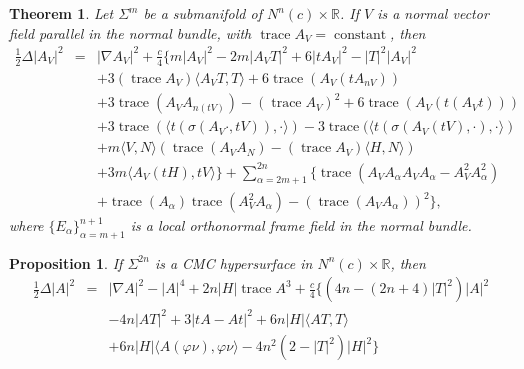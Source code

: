 \documentclass[10pt,a4paper]{amsart}
\newtheorem{theorem}{Theorem}
\newtheorem{proposition}{Proposition}
\DeclareMathOperator{\cst}{constant}
\DeclareMathOperator{\trace}{trace} \DeclareMathOperator{\di}{div}
\begin{document}
\begin{theorem}\label{thm:delta2_prod}
Let $\Sigma^m$ be a submanifold of $N^n(c)\times\mathbb{R}$. If $V$ is a normal vector field parallel in the normal bundle, with $\trace A_V=\cst$, then
\begin{eqnarray}\label{eq:delta2_prod}
\frac{1}{2}\Delta|A_V|^2&=&|\nabla A_V|^2+\frac{c}{4}\{m|A_V|^2-2m|A_VT|^2+6|tA_V|^2-|T|^2|A_V|^2\\\nonumber &&+3(\trace A_V)\langle A_VT,T\rangle+6\trace(A_V(tA_{nV}))\\\nonumber &&+3\trace(A_VA_{n(tV)})-(\trace A_V)^2+6\trace(A_V(t(A_Vt)))\\\nonumber &&+3\trace(\langle t(\sigma(A_V\cdot,tV)),\cdot\rangle)-3\trace(\langle t(\sigma(A_V(tV),\cdot),\cdot\rangle)\\\nonumber &&+m\langle V,N\rangle(\trace(A_VA_N)-(\trace A_V)\langle H,N\rangle)\\\nonumber&&+3m\langle A_V(tH),tV\rangle\}+\sum_{\alpha=2m+1}^{2n}\{\trace(A_VA_{\alpha}A_VA_{\alpha}-A_V^2A_{\alpha}^2)\\\nonumber &&+\trace(A_{\alpha})\trace(A_V^2A_{\alpha})-(\trace(A_VA_{\alpha}))^2\},
\end{eqnarray}
where $\{E_{\alpha}\}_{\alpha=m+1}^{n+1}$ is a local orthonormal frame field in the normal bundle.
\end{theorem}

\begin{proposition}\label{hyper} If $\Sigma^{2n}$ is a CMC hypersurface in $N^n(c)\times\mathbb{R}$, then
\begin{eqnarray}\label{eq:hyper2_prod}
\frac{1}{2}\Delta|A|^2&=&|\nabla A|^2-|A|^4+2n|H|\trace A^3+\frac{c}{4}\{(4n-(2n+4)|T|^2)|A|^2\\\nonumber &&-4n|AT|^2+3|tA-At|^2+6n|H|\langle AT,T\rangle\\\nonumber&&+6n|H|\langle A(\varphi\nu),\varphi\nu\rangle-4n^2(2-|T|^2)|H|^2\}
\end{eqnarray}

\end{proposition}
\end{document}
